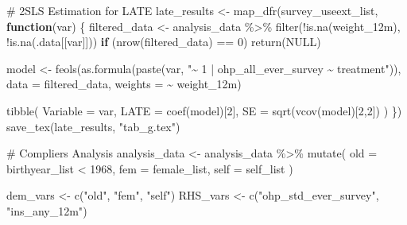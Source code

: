 \documentclass[
  letterpaper,
  DIV=11,
  numbers=noendperiod]{scrartcl}
\newenvironment{Shaded}{\begin{snugshade}}{\end{snugshade}}
\newcommand{\AttributeTok}[1]{\textcolor[rgb]{0.40,0.45,0.13}{#1}}
\newcommand{\CommentTok}[1]{\textcolor[rgb]{0.37,0.37,0.37}{#1}}
\newcommand{\ConstantTok}[1]{\textcolor[rgb]{0.56,0.35,0.01}{#1}}
\newcommand{\ControlFlowTok}[1]{\textcolor[rgb]{0.00,0.23,0.31}{\textbf{#1}}}
\newcommand{\DecValTok}[1]{\textcolor[rgb]{0.68,0.00,0.00}{#1}}
\newcommand{\FunctionTok}[1]{\textcolor[rgb]{0.28,0.35,0.67}{#1}}
\newcommand{\NormalTok}[1]{\textcolor[rgb]{0.00,0.23,0.31}{#1}}
\newcommand{\OtherTok}[1]{\textcolor[rgb]{0.00,0.23,0.31}{#1}}
\newcommand{\SpecialCharTok}[1]{\textcolor[rgb]{0.37,0.37,0.37}{#1}}
\newcommand{\StringTok}[1]{\textcolor[rgb]{0.13,0.47,0.30}{#1}}
\begin{document}
\begin{Shaded}
\begin{Highlighting}[]
\CommentTok{\# 2SLS Estimation for LATE}
\NormalTok{late\_results }\OtherTok{\textless{}{-}} \FunctionTok{map\_dfr}\NormalTok{(survey\_useext\_list, }\ControlFlowTok{function}\NormalTok{(var) \{}
\NormalTok{  filtered\_data }\OtherTok{\textless{}{-}}\NormalTok{ analysis\_data }\SpecialCharTok{\%\textgreater{}\%} \FunctionTok{filter}\NormalTok{(}\SpecialCharTok{!}\FunctionTok{is.na}\NormalTok{(weight\_12m), }\SpecialCharTok{!}\FunctionTok{is.na}\NormalTok{(.data[[var]]))}
  \ControlFlowTok{if}\NormalTok{ (}\FunctionTok{nrow}\NormalTok{(filtered\_data) }\SpecialCharTok{==} \DecValTok{0}\NormalTok{) }\FunctionTok{return}\NormalTok{(}\ConstantTok{NULL}\NormalTok{)}
  
\NormalTok{  model }\OtherTok{\textless{}{-}} \FunctionTok{feols}\NormalTok{(}\FunctionTok{as.formula}\NormalTok{(}\FunctionTok{paste}\NormalTok{(var, }\StringTok{"\textasciitilde{} 1 | ohp\_all\_ever\_survey \textasciitilde{} treatment"}\NormalTok{)), }
                 \AttributeTok{data =}\NormalTok{ filtered\_data, }
                 \AttributeTok{weights =} \SpecialCharTok{\textasciitilde{}}\NormalTok{ weight\_12m)}
  
  \FunctionTok{tibble}\NormalTok{(}
    \AttributeTok{Variable =}\NormalTok{ var,}
    \AttributeTok{LATE =} \FunctionTok{coef}\NormalTok{(model)[}\DecValTok{2}\NormalTok{],}
    \AttributeTok{SE =} \FunctionTok{sqrt}\NormalTok{(}\FunctionTok{vcov}\NormalTok{(model)[}\DecValTok{2}\NormalTok{,}\DecValTok{2}\NormalTok{])}
\NormalTok{  )}
\NormalTok{\})}
\FunctionTok{save\_tex}\NormalTok{(late\_results, }\StringTok{"tab\_g.tex"}\NormalTok{)}




\CommentTok{\# Compliers Analysis}
\NormalTok{analysis\_data }\OtherTok{\textless{}{-}}\NormalTok{ analysis\_data }\SpecialCharTok{\%\textgreater{}\%}
  \FunctionTok{mutate}\NormalTok{(}
    \AttributeTok{old =}\NormalTok{ birthyear\_list }\SpecialCharTok{\textless{}} \DecValTok{1968}\NormalTok{,}
    \AttributeTok{fem =}\NormalTok{ female\_list,}
    \AttributeTok{self =}\NormalTok{ self\_list}
\NormalTok{  )}

\NormalTok{dem\_vars }\OtherTok{\textless{}{-}} \FunctionTok{c}\NormalTok{(}\StringTok{"old"}\NormalTok{, }\StringTok{"fem"}\NormalTok{, }\StringTok{"self"}\NormalTok{)}
\NormalTok{RHS\_vars }\OtherTok{\textless{}{-}} \FunctionTok{c}\NormalTok{(}\StringTok{"ohp\_std\_ever\_survey"}\NormalTok{, }\StringTok{"ins\_any\_12m"}\NormalTok{)}


\end{Highlighting}
\end{Shaded}
\end{document}
